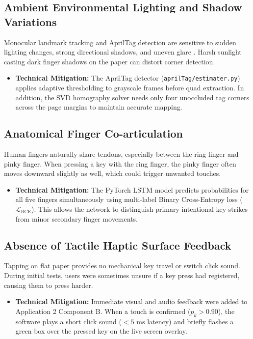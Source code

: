\subsection{Ambient Environmental Lighting and Shadow Variations}
Monocular landmark tracking and AprilTag detection are sensitive to sudden lighting changes, strong directional shadows, and uneven glare \cite{ReviewVirtualKeyboard2020}. Harsh sunlight casting dark finger shadows on the paper can distort corner detection.
\begin{itemize}
    \item \textbf{Technical Mitigation:} The AprilTag detector (\texttt{aprilTag/estimater.py}) applies adaptive thresholding to grayscale frames before quad extraction. In addition, the SVD homography solver needs only four unoccluded tag corners across the page margins to maintain accurate mapping.
\end{itemize}

\subsection{Anatomical Finger Co-articulation}
Human fingers naturally share tendons, especially between the ring finger and pinky finger. When pressing a key with the ring finger, the pinky finger often moves downward slightly as well, which could trigger unwanted touches.
\begin{itemize}
    \item \textbf{Technical Mitigation:} The PyTorch LSTM model predicts probabilities for all five fingers simultaneously using multi-label Binary Cross-Entropy loss ($\mathcal{L}_{\text{BCE}}$). This allows the network to distinguish primary intentional key strikes from minor secondary finger movements.
\end{itemize}

\subsection{Absence of Tactile Haptic Surface Feedback}
Tapping on flat paper provides no mechanical key travel or switch click sound. During initial tests, users were sometimes unsure if a key press had registered, causing them to press harder.
\begin{itemize}
    \item \textbf{Technical Mitigation:} Immediate visual and audio feedback were added to Application 2 Component B. When a touch is confirmed ($p_k > 0.90$), the software plays a short click sound ($< 5\text{ ms}$ latency) and briefly flashes a green box over the pressed key on the live screen overlay.
\end{itemize}

